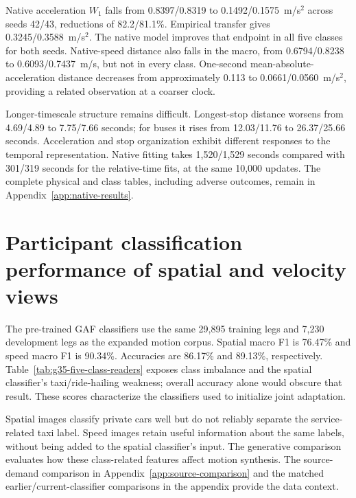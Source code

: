 Native acceleration $W_1$ falls from 0.8397/0.8319 to 0.1492/0.1575~m/s$^2$ across seeds 42/43, reductions of 82.2/81.1\%. Empirical transfer gives 0.3245/0.3588~m/s$^2$. The native model improves that endpoint in all five classes for both seeds. Native-speed distance also falls in the macro, from 0.6794/0.8238 to 0.6093/0.7437~m/s, but not in every class. One-second mean-absolute-acceleration distance decreases from approximately 0.113 to 0.0661/0.0560~m/s$^2$, providing a related observation at a coarser clock.


Longer-timescale structure remains difficult. Longest-stop distance worsens from 4.69/4.89 to 7.75/7.66 seconds; for buses it rises from 12.03/11.76 to 26.37/25.66 seconds. Acceleration and stop organization exhibit different responses to the temporal representation. Native fitting takes 1,520/1,529 seconds compared with 301/319 seconds for the relative-time fits, at the same 10,000 updates. The complete physical and class tables, including adverse outcomes, remain in Appendix~\ref{app:native-results}.

\section{Participant classification performance of spatial and velocity views}
The pre-trained GAF classifiers use the same 29,895 training legs and 7,230 development legs as the expanded motion corpus. Spatial macro F1 is 76.47\% and speed macro F1 is 90.34\%. Accuracies are 86.17\% and 89.13\%, respectively. Table~\ref{tab:g35-five-class-readers} exposes class imbalance and the spatial classifier's taxi/ride-hailing weakness; overall accuracy alone would obscure that result. These scores characterize the classifiers used to initialize joint adaptation.



Spatial images classify private cars well but do not reliably separate the service-related taxi label. Speed images retain useful information about the same labels, without being added to the spatial classifier's input. The generative comparison evaluates how these class-related features affect motion synthesis. The source-demand comparison in Appendix~\ref{app:source-comparison} and the matched earlier/current-classifier comparisons in the appendix provide the data context.

